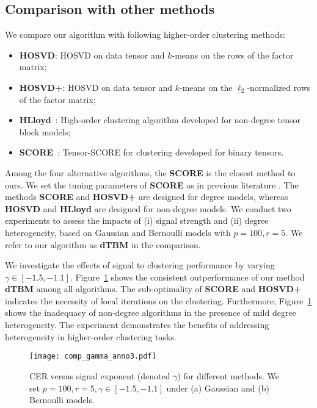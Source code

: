\documentclass[lettersize,onecolumn,journal]{IEEEtran}
\theoremstyle{definition}
\theoremstyle{definition}
\begin{document}
\subsection{Comparison with other methods}\label{subsec:comp}


We compare our algorithm with following higher-order clustering methods:
\begin{itemize}[wide,topsep=-3pt,itemsep=0pt,parsep=1pt]
    \item \textbf{\small HOSVD}: HOSVD on data tensor and $k$-means on the rows of the factor matrix;
    \item \textbf{\small HOSVD+}: HOSVD on data tensor and $k$-means on the $\ell_2$-normalized rows of the factor matrix;
    \item \textbf{\small HLloyd}~\citep{han2020exact}: High-order clustering algorithm developed for non-degree tensor block models;
    \item \textbf{\small SCORE}~\citep{ke2019community}: Tensor-SCORE for clustering developed for binary tensors.
\end{itemize}


Among the four alternative algorithms, the \textbf{\small SCORE} is the closest method to ours. We set the tuning parameters of \textbf{\small SCORE} as in previous literature \citep{ke2019community}. The methods \textbf{\small SCORE} and \textbf{\small HOSVD+} are designed for degree models, whereas \textbf{\small HOSVD} and \textbf{\small HLloyd} are designed for non-degree models. We conduct two experiments to assess the impacts of (i) signal strength and (ii) degree heterogeneity, based on Gaussian and Bernoulli models with $ p = 100, r = 5$. We refer to our algorithm as \textbf{\small dTBM} in the comparison. 

We investigate the effects of signal to clustering performance by varying $\gamma \in [-1.5, -1.1]$. Figure~\ref{fig:comp_gamma} shows the consistent outperformance of our method \textbf{\small dTBM} among all algorithms. The sub-optimality of \textbf{\small SCORE} and \textbf{\small HOSVD+} indicates the necessity of local iterations on the clustering. Furthermore,  Figure~\ref{fig:comp_gamma} shows the inadequacy of non-degree algorithms in the presence of mild degree heterogeneity. 
The experiment demonstrates the benefits of addressing heterogeneity in higher-order clustering tasks.   


\begin{figure}[h!]
    \centering
    \texttt{[image: comp\_gamma\_anno3.pdf]}
    \caption{CER versus signal exponent (denoted $\gamma$) for different methods. We set $p = 100, r = 5, \gamma \in [-1.5, -1.1]$ under (a) Gaussian and (b) Bernoulli models.}
    \label{fig:comp_gamma}
\end{figure}
\end{document}
